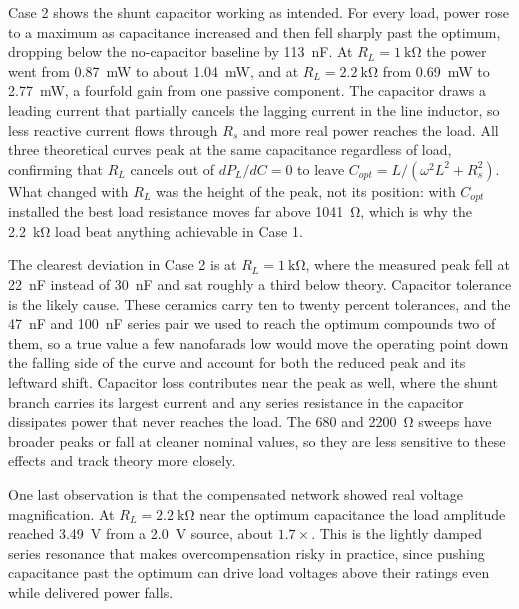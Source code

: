 \documentclass[11pt]{article}
\begin{document}
Case 2 shows the shunt capacitor working as intended. For every load, power rose
to a maximum as capacitance increased and then fell sharply past the optimum,
dropping below the no-capacitor baseline by \SI{113}{\nano\farad}. At
$R_L=\SI{1}{\kilo\ohm}$ the power went from \SI{0.87}{\milli\watt} to about
\SI{1.04}{\milli\watt}, and at $R_L=\SI{2.2}{\kilo\ohm}$ from
\SI{0.69}{\milli\watt} to \SI{2.77}{\milli\watt}, a fourfold gain from one
passive component. The capacitor draws a leading current that partially cancels
the lagging current in the line inductor, so less reactive current flows through
$R_s$ and more real power reaches the load. All three theoretical curves peak at
the same capacitance regardless of load, confirming that $R_L$ cancels out of
$dP_L/dC = 0$ to leave $C_{opt}=L/(\omega^2 L^2 + R_s^2)$. What changed with
$R_L$ was the height of the peak, not its position: with $C_{opt}$ installed the
best load resistance moves far above \SI{1041}{\ohm}, which is why the
\SI{2.2}{\kilo\ohm} load beat anything achievable in Case 1.

The clearest deviation in Case 2 is at $R_L=\SI{1}{\kilo\ohm}$, where the
measured peak fell at \SI{22}{\nano\farad} instead of \SI{30}{\nano\farad} and
sat roughly a third below theory. Capacitor tolerance is the likely cause. These
ceramics carry ten to twenty percent tolerances, and the
\SI{47}{\nano\farad} and \SI{100}{\nano\farad} series pair we used to reach the
optimum compounds two of them, so a true value a few nanofarads low would move
the operating point down the falling side of the curve and account for both the
reduced peak and its leftward shift. Capacitor loss contributes near the peak as
well, where the shunt branch carries its largest current and any series
resistance in the capacitor dissipates power that never reaches the load. The
$680$ and \SI{2200}{\ohm} sweeps have broader peaks or fall at cleaner nominal
values, so they are less sensitive to these effects and track theory more
closely.

One last observation is that the compensated network showed real voltage
magnification. At $R_L=\SI{2.2}{\kilo\ohm}$ near the optimum capacitance the load
amplitude reached \SI{3.49}{\volt} from a \SI{2.0}{\volt} source, about
$1.7\times$. This is the lightly damped series resonance that makes
overcompensation risky in practice, since pushing capacitance past the optimum
can drive load voltages above their ratings even while delivered power falls.

\end{document}
